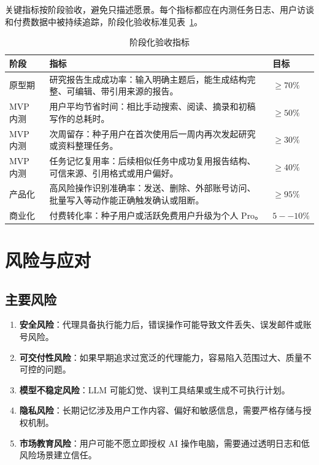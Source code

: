 \documentclass[12pt,a4paper]{ctexart}
\begin{document}
关键指标按阶段验收，避免只描述愿景。每个指标都应在内测任务日志、用户访谈和付费数据中被持续追踪，阶段化验收标准见表~\ref{tab:stage-metrics}。

\begin{table}[htbp]
  \centering
  \small
  \begin{tabularx}{\textwidth}{p{2.8cm} X p{3cm}}
    \toprule
    \textbf{阶段} & \textbf{指标} & \textbf{目标} \\
    \midrule
    原型期 & 研究报告生成成功率：输入明确主题后，能生成结构完整、可编辑、带引用来源的报告。 & $\geq 70\%$ \\
    MVP 内测 & 用户平均节省时间：相比手动搜索、阅读、摘录和初稿写作的总耗时。 & $\geq 50\%$ \\
    MVP 内测 & 次周留存：种子用户在首次使用后一周内再次发起研究或资料整理任务。 & $\geq 30\%$ \\
    MVP 内测 & 任务记忆复用率：后续相似任务中成功复用报告结构、可信来源、引用格式或用户偏好。 & $\geq 40\%$ \\
    产品化 & 高风险操作识别准确率：发送、删除、外部账号访问、批量写入等动作能正确触发确认或阻断。 & $\geq 95\%$ \\
    商业化 & 付费转化率：种子用户或活跃免费用户升级为个人 Pro。 & $5--10\%$ \\
    \bottomrule
  \end{tabularx}
  \caption{阶段化验收指标}
  \label{tab:stage-metrics}
\end{table}

\section{风险与应对}

\subsection{主要风险}

\begin{enumerate}
  \item \textbf{安全风险}：代理具备执行能力后，错误操作可能导致文件丢失、误发邮件或账号风险。
  \item \textbf{可交付性风险}：如果早期追求过宽泛的代理能力，容易陷入范围过大、质量不可控的问题。
  \item \textbf{模型不稳定风险}：LLM 可能幻觉、误判工具结果或生成不可执行计划。
  \item \textbf{隐私风险}：长期记忆涉及用户工作内容、偏好和敏感信息，需要严格存储与授权机制。
  \item \textbf{市场教育风险}：用户可能不愿立即授权 AI 操作电脑，需要通过透明日志和低风险场景建立信任。
\end{enumerate}
\end{document}
